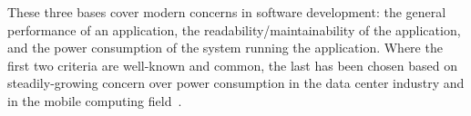 These three bases cover modern concerns in software development: the general performance of an application, the readability/maintainability of the application, and the power consumption of the system running the application. Where the first two criteria are well-known and common, the last has been chosen based on steadily-growing concern over power consumption in the data center industry and in the mobile computing field~\cite{pereira}.
